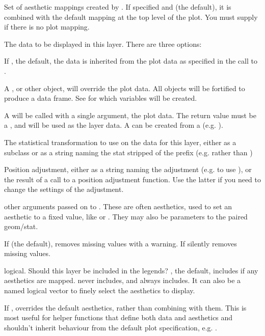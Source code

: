 \documentclass[a4paper]{book}
\begin{document}
\begin{Arguments}
\begin{ldescription}
\item[\code{mapping}] Set of aesthetic mappings created by . If specified and
 (the default), it is combined with the default mapping
at the top level of the plot. You must supply  if there is no plot
mapping.

\item[\code{data}] The data to be displayed in this layer. There are three
options:

If , the default, the data is inherited from the plot
data as specified in the call to .

A , or other object, will override the plot
data. All objects will be fortified to produce a data frame. See
 for which variables will be created.

A  will be called with a single argument,
the plot data. The return value must be a , and
will be used as the layer data. A  can be created
from a  (e.g. ).

\item[\code{stat}] The statistical transformation to use on the data for this
layer, either as a   subclass or as a string naming the
stat stripped of the  prefix (e.g.  rather than
)

\item[\code{position}] Position adjustment, either as a string naming the adjustment
(e.g.  to use ), or the result of a call to a
position adjustment function. Use the latter if you need to change the
settings of the adjustment.

\item[\code{...}] other arguments passed on to . These are
often aesthetics, used to set an aesthetic to a fixed value, like
 or . They may also be parameters
to the paired geom/stat.

\item[\code{na.rm}] If  (the default), removes missing values with
a warning.  If  silently removes missing values.

\item[\code{show.legend}] logical. Should this layer be included in the legends?
, the default, includes if any aesthetics are mapped.
 never includes, and  always includes.
It can also be a named logical vector to finely select the aesthetics to
display.

\item[\code{inherit.aes}] If , overrides the default aesthetics,
rather than combining with them. This is most useful for helper functions
that define both data and aesthetics and shouldn't inherit behaviour from
the default plot specification, e.g. .
\end{ldescription}
\end{Arguments}
\end{document}
